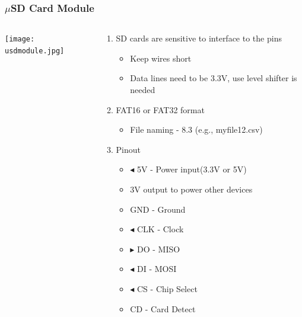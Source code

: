 \documentclass{beamer}
\begin{document}
\begin{frame}\frametitle{$\mu$SD Card Module}
\begin{columns}

\begin{column}{4.5cm}
\texttt{[image: usdmodule.jpg]}
\end{column}

\begin{column}{7.0cm}
\begin{enumerate}
\item SD cards are sensitive to interface to the pins
	\begin{itemize}
		\item Keep wires short		
		\item Data lines need to be 3.3V, use level shifter is needed	
	\end{itemize}
\item FAT16 or FAT32 format
	\begin{itemize}
		\item File naming - 8.3 (e.g., myfile12.csv)		
	\end{itemize}
\item Pinout
	\begin{itemize}
		\item $\blacktriangleleft$ 5V - Power input(3.3V or 5V)
		\item 3V output to power other devices
		\item GND - Ground
		\item $\blacktriangleleft$ CLK - Clock
		\item $\blacktriangleright$ DO - MISO
		\item $\blacktriangleleft$ DI - MOSI
		\item $\blacktriangleleft$ CS - Chip Select
		\item CD - Card Detect
	\end{itemize}
\end{enumerate}
\end{column}
\end{columns}
\end{frame}
\end{document}
